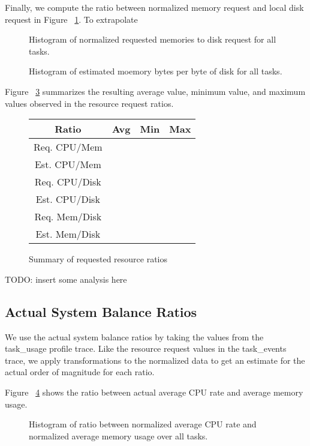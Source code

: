\documentclass{sig-alternate}
\begin{document}
Finally, we compute the ratio between normalized memory request and local disk request in Figure ~\ref{req_mem_disk}.
To extrapolate

\begin{figure}
\label{req_mem_disk}
\caption{Histogram of normalized requested memories to disk request for all tasks.}
\end{figure}

\begin{figure}
\label{est_req_mem_disk}
\caption{Histogram of estimated moemory bytes per byte of disk for all tasks.}
\end{figure}

Figure ~\ref{request_summary} summarizes the resulting average value, minimum value, and maximum values observed in the resource request ratios.

\begin{figure}
\centering
\begin{tabular}{| c | c | c | c |} \hline
Ratio & Avg & Min & Max \\ \hline
Req. CPU/Mem & & & \\ \hline
Est. CPU/Mem & & & \\ \hline
Req. CPU/Disk & & & \\ \hline
Est. CPU/Disk & & & \\ \hline
Req. Mem/Disk & & & \\ \hline
Est. Mem/Disk & & & \\ \hline
\end{tabular}
\label{request_summary}
\caption{Summary of requested resource ratios}
\end{figure}

TODO: insert some analysis here

\subsection{Actual System Balance Ratios}

We use the actual system balance ratios by taking the values from the task\_usage profile trace.
Like the resource request values in the task\_events trace, we apply transformations to the normalized data to get an estimate for the actual order of magnitude for each ratio.

Figure ~\ref{act_cpu_mem} shows the ratio between actual average CPU rate and average memory usage.

\begin{figure}
\centering
\label{act_cpu_mem}
\caption{Histogram of ratio between normalized average CPU rate and normalized average memory usage over all tasks.}
\end{figure}
\end{document}
